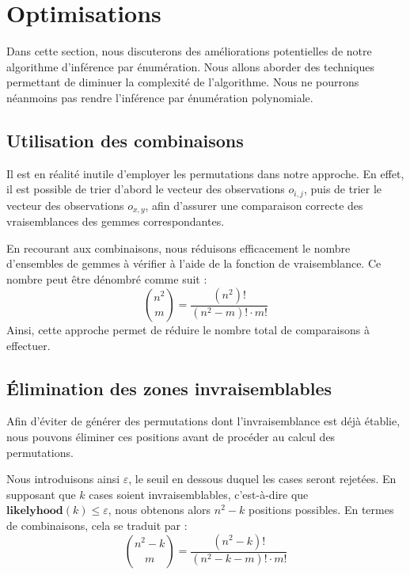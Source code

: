 \documentclass{article}
\begin{document}
\section{Optimisations}

\noindent Dans cette section, nous discuterons des améliorations potentielles de notre algorithme d'inférence par énumération. Nous allons aborder des techniques permettant de diminuer la complexité de l'algorithme. Nous ne pourrons néanmoins pas rendre l'inférence par énumération polynomiale.

\subsection{Utilisation des combinaisons}

\noindent Il est en réalité inutile d'employer les permutations dans notre approche. En effet, il est possible de trier d'abord le vecteur des observations \( o_{i,j} \), puis de trier le vecteur des observations \( o_{x,y} \), afin d'assurer une comparaison correcte des vraisemblances des gemmes correspondantes.

\vspace{1em}

\noindent En recourant aux combinaisons, nous réduisons efficacement le nombre d'ensembles de gemmes à vérifier à l'aide de la fonction de vraisemblance. Ce nombre peut être dénombré comme suit :
\[
\binom{n^2}{m} = \frac{(n^2)!}{(n^2 - m)! \cdot m!}
\]
Ainsi, cette approche permet de réduire le nombre total de comparaisons à effectuer.

\subsection{Élimination des zones invraisemblables}

\noindent Afin d'éviter de générer des permutations dont l'invraisemblance est déjà établie, nous pouvons éliminer ces positions avant de procéder au calcul des permutations.

\vspace{1em}

\noindent Nous introduisons ainsi \( \varepsilon \), le seuil en dessous duquel les cases seront rejetées. En supposant que \( k \) cases soient invraisemblables, c'est-à-dire que \( \textbf{likelyhood}(k) \leq \varepsilon \), nous obtenons alors \( n^2 - k \) positions possibles. En termes de combinaisons, cela se traduit par :
\[
\binom{n^2 - k}{m} = \frac{(n^2 - k)!}{(n^2 - k - m)! \cdot m!}
\]
\end{document}

